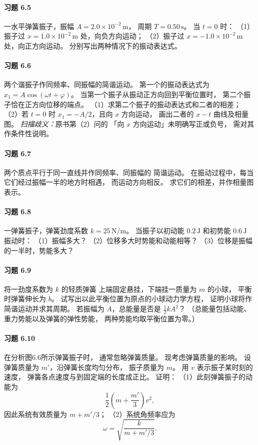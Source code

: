 \paragraph{习题 6.5}
一水平弹簧振子，振幅
\(A=2.0\times10^{-2}\,\mathrm m\)，
周期 \(T=0.50\,\mathrm s\)。
当 \(t=0\) 时：
（1）振子过 \(x=1.0\times10^{-2}\,\mathrm m\)
处，向负方向运动；
（2）振子过 \(x=-1.0\times10^{-2}\,\mathrm m\)
处，向正方向运动。
分别写出两种情况下的振动表达式。

\paragraph{习题 6.6}
两个谐振子作同频率、同振幅的简谐运动。
第一个的振动表达式为
\(x_1=A\cos(\omega t+\varphi)\)。
当第一个振子从振动正方向回到平衡位置时，
第二个振子恰在正方向位移的端点。
（1）求第二个振子的振动表达式和二者的相差；
（2）若 \(t=0\) 时
\(x_1=-A/2\)，且向 \(x\) 方向运动，
画出二者的 \(x-t\) 曲线及相量图。
\textit{扫描歧义：}原书第（2）问的
「向 \(x\) 方向运动」未明确写正或负号，
需对其作条件性说明。

\paragraph{习题 6.7}
两个质点平行于同一直线并作同频率、同振幅的
简谐运动。
在振动过程中，每当它们经过振幅一半的地方时相遇，
而运动方向相反。
求它们的相差，并作相量图表示。

\paragraph{习题 6.8}
一弹簧振子，弹簧劲度系数
\(k=25\,\mathrm{N/m}\)。
当振子以初动能 \(0.2\,\mathrm J\)
和初势能 \(0.6\,\mathrm J\) 振动时：
（1）振幅多大？
（2）位移多大时势能和动能相等？
（3）位移是振幅的一半时，势能多大？

\paragraph{习题 6.9}
将一劲度系数为 \(k\) 的轻质弹簧
上端固定悬挂，下端挂一质量为 \(m\) 的小球，
平衡时弹簧伸长为 \(b\)。
试写出以此平衡位置为原点的小球动力学方程，
证明小球将作简谐运动并求其周期。
若振幅为 \(A\)，总能量是否是
\(\tfrac12kA^2\)？
（总能量包括动能、重力势能以及弹簧的弹性势能，
两种势能均取平衡位置为零。）

\paragraph{习题 6.10}
在分析图6.6所示弹簧振子时，
通常忽略弹簧质量。
现考虑弹簧质量的影响。
设弹簧质量为 \(m'\)，沿弹簧长度均匀分布，
振子质量为 \(m\)。
用 \(v\) 表示振子某时刻的速度，
弹簧各点速度与到固定端的长度成正比。
证明：
（1）此刻弹簧振子的动能为
\[
 \frac12\left(m+\frac{m'}3\right)v^2,
\]
因此系统有效质量为 \(m+m'/3\)；
（2）系统角频率应为
\[
 \omega=\sqrt{\frac{k}{m+m'/3}}.
\]

